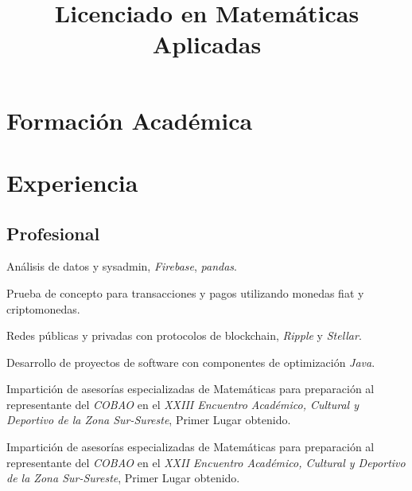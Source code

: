 \documentclass[11pt,letter]{moderncv}
\title{Licenciado en Matemáticas Aplicadas}
\begin{document}
\makecvtitle

\section{Formación Académica}
\label{sec:formacion-academica}


\section{Experiencia}
\label{sec:experiencia}
\subsection{Profesional}
\label{sec:profesional}



 {Análisis de datos y sysadmin, \emph{Firebase}, \emph{pandas}.}

 {Prueba de concepto para transacciones y pagos utilizando monedas fiat y criptomonedas.}


 {Redes públicas y privadas con protocolos de blockchain, \emph{Ripple} y \emph{Stellar}.}

 {Desarrollo de proyectos de software
  con componentes de optimización {\em Java}.}

 {Impartición de asesorías
  especializadas de Matemáticas para preparación al representante del
  {\em COBAO} en el {\em XXIII Encuentro Académico, Cultural y
    Deportivo de la Zona Sur-Sureste}, Primer Lugar obtenido.}

 {Impartición de asesorías
  especializadas de Matemáticas para preparación al representante del
  {\em COBAO} en el {\em XXII Encuentro Académico, Cultural y
    Deportivo de la Zona Sur-Sureste}, Primer Lugar obtenido.}
\end{document}
